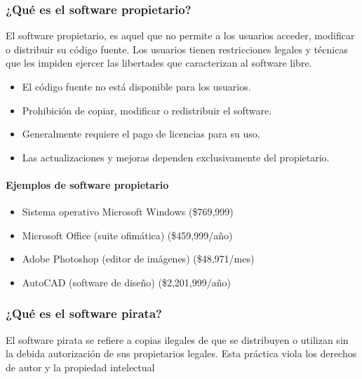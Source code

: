 \documentclass[letterpaper,10pt,spanish]{sphinxmanual}
\begin{document}
\subsubsection{¿Qué es el software propietario?}
\label{\detokenize{1_guias/10ofimatica/G1019:que-es-el-software-propietario}}
\sphinxAtStartPar
El software propietario, es aquel que no permite a los usuarios acceder, modificar o distribuir su código fuente. Los usuarios tienen restricciones legales y técnicas que les impiden ejercer las libertades que caracterizan al software libre.
\begin{itemize}
\item {} 
\sphinxAtStartPar
El código fuente no está disponible para los usuarios.

\item {} 
\sphinxAtStartPar
Prohibición de copiar, modificar o redistribuir el software.

\item {} 
\sphinxAtStartPar
Generalmente requiere el pago de licencias para su uso.

\item {} 
\sphinxAtStartPar
Las actualizaciones y mejoras dependen exclusivamente del propietario.

\end{itemize}


\paragraph{Ejemplos de software propietario}
\label{\detokenize{1_guias/10ofimatica/G1019:ejemplos-de-software-propietario}}\begin{itemize}
\item {} 
\sphinxAtStartPar
Sistema operativo Microsoft Windows (\$769,999)

\item {} 
\sphinxAtStartPar
Microsoft Office (suite ofimática) (\$459,999/año)

\item {} 
\sphinxAtStartPar
Adobe Photoshop (editor de imágenes) (\$48,971/mes)

\item {} 
\sphinxAtStartPar
AutoCAD (software de diseño) (\$2,201,999/año)

\end{itemize}


\subsubsection{¿Qué es el software pirata?}
\label{\detokenize{1_guias/10ofimatica/G1019:que-es-el-software-pirata}}
\sphinxAtStartPar
El software pirata se refiere a copias ilegales de  que se distribuyen o utilizan sin la debida autorización de sus propietarios legales. Esta práctica viola los derechos de autor y la propiedad intelectual
\end{document}
